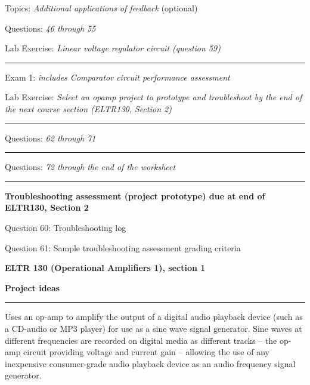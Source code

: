 \hskip 10pt Topics: {\it Additional applications of feedback} (optional)
 
\hskip 10pt Questions: {\it 46 through 55}
 
\hskip 10pt Lab Exercise: {\it Linear voltage regulator circuit (question 59)}
 

\vskip 10pt
\hrule \vskip 5pt
\noindent
{}

\hskip 10pt Exam 1: {\it includes Comparator circuit performance assessment}
 
\hskip 10pt Lab Exercise: {\it Select an opamp project to prototype and troubleshoot by the end of the next course section (ELTR130, Section 2)}
  
\vskip 10pt
\hrule \vskip 5pt
\noindent
{}

\hskip 10pt Questions: {\it 62 through 71}
 
\vskip 10pt
\hrule \vskip 5pt
\noindent
{}

\hskip 10pt Questions: {\it 72 through the end of the worksheet}
 
\vskip 10pt
\hrule \vskip 5pt
\noindent
{}

\hskip 10pt {\bf Troubleshooting assessment (project prototype) due at end of ELTR130, Section 2}

\hskip 10pt Question 60: Troubleshooting log
 
\hskip 10pt Question 61: Sample troubleshooting assessment grading criteria
 
\vskip 10pt




\vfil \eject

\centerline{\bf ELTR 130 (Operational Amplifiers 1), section 1} \bigskip 
 
\vskip 10pt

\noindent
{\bf Project ideas}

\vskip 5pt

\hrule \vskip 5pt

\vskip 10pt

\noindent
{} Uses an op-amp to amplify the output of a digital audio playback device (such as a CD-audio or MP3 player) for use as a sine wave signal generator.  Sine waves at different frequencies are recorded on digital media as different tracks -- the op-amp circuit providing voltage and current gain -- allowing the use of any inexpensive consumer-grade audio playback device as an audio frequency signal generator.

